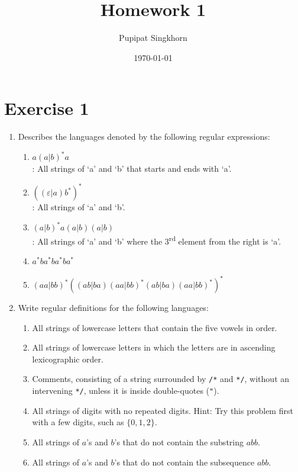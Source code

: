 \documentclass{article}
\begin{document}
\title{Homework 1}
\author{Pupipat Singkhorn}
\date{\today}
\maketitle

\section*{Exercise 1}

\begin{enumerate}
    \item Describes the languages denoted by the following regular expressions:
    \begin{enumerate}
        \item $a(a|b)^*a$\\
        : All strings of `a' and `b' that starts and ends with `a'.
        \item $((\varepsilon|a)b^*)^*$\\
        : All strings of `a' and `b'.
        \item $(a|b)^*a(a|b)(a|b)$\\
        : All strings of `a' and `b' where the 3\textsuperscript{rd} element from the right is `a'.
        \item $a^*ba^*ba^*ba^*$
        \item $(aa|bb)^*((ab|ba)(aa|bb)^*(ab|ba)(aa|bb)^*)^*$
    \end{enumerate}
    \item Write regular definitions for the following languages:
    \begin{enumerate}
        \item All strings of lowercase letters that contain the five vowels in order.
        \item All strings of lowercase letters in which the letters are in ascending lexicographic order.
        \item Comments, consisting of a string surrounded by \texttt{/*} and \texttt{*/}, without an intervening \texttt{*/}, unless it is inside double-quotes (\texttt{"}).
        \item All strings of digits with no repeated digits. Hint: Try this problem first with a few digits, such as $\{0, 1, 2\}$.
        \item All strings of $a$'s and $b$'s that do not contain the substring $abb$.
        \item All strings of $a$'s and $b$'s that do not contain the subsequence $abb$.

\end{enumerate}
\end{enumerate}
\end{document}
